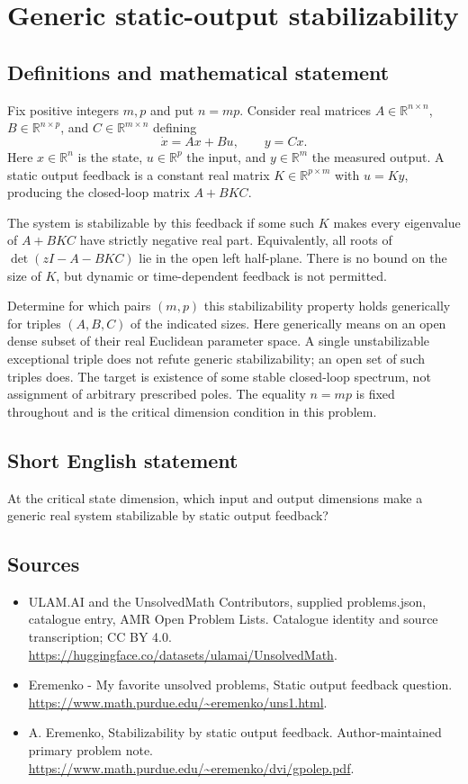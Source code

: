 \documentclass[11pt,a4paper]{article}
\begin{document}
\section*{Generic static-output stabilizability}\label{statement}

\subsection{Definitions and mathematical statement}
Fix positive integers $m,p$ and put $n=mp$.
Consider real matrices
$A\in\mathbb R^{n\times n}$,
$B\in\mathbb R^{n\times p}$, and
$C\in\mathbb R^{m\times n}$ defining
\[
                  \dot x=Ax+Bu,\qquad y=Cx.
\]
Here $x\in\mathbb R^n$ is the state,
$u\in\mathbb R^p$ the input, and
$y\in\mathbb R^m$ the measured output.
A static output feedback is a constant real
matrix $K\in\mathbb R^{p\times m}$ with
$u=Ky$, producing the closed-loop matrix
$A+BKC$.

The system is stabilizable by this feedback if
some such $K$ makes every eigenvalue of
$A+BKC$ have strictly negative real part.
Equivalently, all roots of
$\det(zI-A-BKC)$ lie in the open left
half-plane. There is no bound on the size
of $K$, but dynamic or time-dependent feedback
is not permitted.

Determine for which pairs $(m,p)$ this
stabilizability property holds generically for
triples $(A,B,C)$ of the indicated sizes.
Here generically means on an open dense
subset of their real Euclidean parameter
space. A single unstabilizable exceptional
triple does not refute generic stabilizability;
an open set of such triples does.
The target is existence of some stable
closed-loop spectrum, not assignment of
arbitrary prescribed poles. The equality
$n=mp$ is fixed throughout and is the
critical dimension condition in this problem.
\subsection{Short English statement}
At the critical state dimension, which input and output dimensions make a generic real system stabilizable by static output feedback?
\subsection{Sources}
\begin{itemize}
\item[S1] ULAM.AI and the UnsolvedMath Contributors, supplied problems.json, catalogue entry, AMR Open Problem Lists. Catalogue identity and source transcription; CC BY 4.0.
\url{https://huggingface.co/datasets/ulamai/UnsolvedMath}.
\item[S2] Eremenko - My favorite unsolved problems, Static output feedback question. 
\url{https://www.math.purdue.edu/~eremenko/uns1.html}.
\item[S3] A. Eremenko, Stabilizability by static output feedback. Author-maintained primary problem note.
\url{https://www.math.purdue.edu/~eremenko/dvi/gpolep.pdf}.
\end{itemize}
\end{document}

